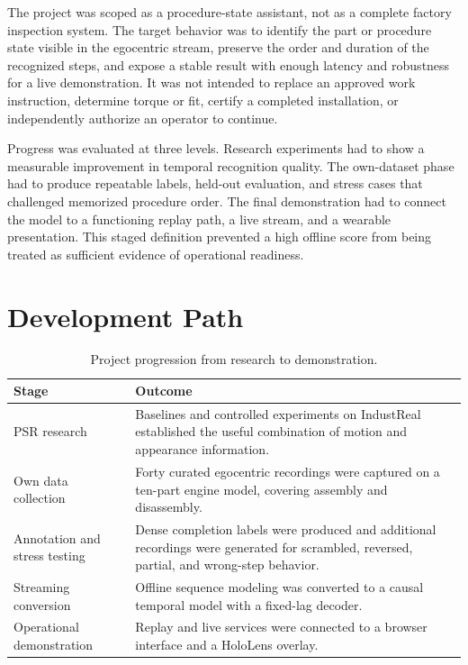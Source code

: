 The project was scoped as a procedure-state assistant, not as a complete
factory inspection system. The target behavior was to identify the part or
procedure state visible in the egocentric stream, preserve the order and
duration of the recognized steps, and expose a stable result with enough
latency and robustness for a live demonstration. It was not intended to
replace an approved work instruction, determine torque or fit, certify a
completed installation, or independently authorize an operator to continue.

Progress was evaluated at three levels. Research experiments had to show a
measurable improvement in temporal recognition quality. The own-dataset phase
had to produce repeatable labels, held-out evaluation, and stress cases that
challenged memorized procedure order. The final demonstration had to connect
the model to a functioning replay path, a live stream, and a wearable
presentation. This staged definition prevented a high offline score from being
treated as sufficient evidence of operational readiness.

\section{Development Path}

\begin{table}[H]
\centering
\small
\begin{tabularx}{\textwidth}{@{}p{}X@{}}
\toprule
\textbf{Stage} & \textbf{Outcome} \\
\midrule
PSR research & Baselines and controlled experiments on IndustReal established
the useful combination of motion and appearance information. \\
Own data collection & Forty curated egocentric recordings were captured on a
ten-part engine model, covering assembly and disassembly. \\
Annotation and stress testing & Dense completion labels were produced and
additional recordings were generated for scrambled, reversed, partial, and
wrong-step behavior. \\
Streaming conversion & Offline sequence modeling was converted to a causal
temporal model with a fixed-lag decoder. \\
Operational demonstration & Replay and live services were connected to a
browser interface and a HoloLens overlay. \\
\bottomrule
\end{tabularx}
\caption{Project progression from research to demonstration.}
\label{tab:development-path}
\end{table}

